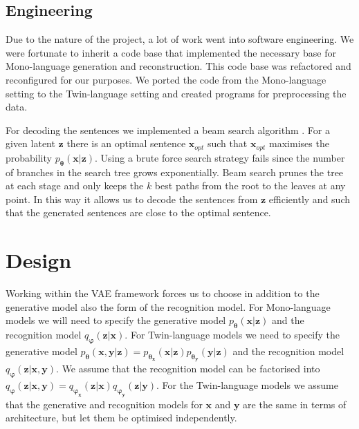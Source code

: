 \subsection{Engineering}
Due to the nature of the project, a lot of work went into software engineering.
We were fortunate to inherit a code base that implemented the necessary base for
Mono-language generation and reconstruction. This code base was refactored and
reconfigured for our purposes. We ported the code from the Mono-language setting
to the Twin-language setting and created programs for preprocessing the data.

For decoding the sentences we implemented a beam search algorithm \cite[p.~249]{Jurafsky:2000:SLP:555733}. For a given
latent $\bm{z}$ there is an optimal sentence $\bm{x}_{opt}$ such that
$\bm{x}_{opt}$ maximises the probability $p_{\bm{\theta}}(\bm{x} | \bm{z})$.
Using a brute force search strategy fails since the number of branches in the
search tree grows exponentially. Beam search prunes the tree at each stage and
only keeps the $k$ best paths from the root to the leaves at any point. In this
way it allows us to decode the sentences from $\bm{z}$ efficiently and such that
the generated sentences are close to the optimal sentence.

\section{Design}
Working within the VAE framework forces us to choose in addition to the generative
model also the form of the recognition model. For Mono-language models we will need to specify the generative model
$p_{\bm{\theta}}(\bm{x} | \bm{z})$ and the recognition model $q_{\bm{\varphi}}(\bm{z} |
\bm{x})$. For Twin-language models we need
to specify the generative model $p_{\bm{\theta}}(\bm{x}, \bm{y} | \bm{z}) = p_{\bm{\theta}_{\bm{x}}}(\bm{x}| \bm{z})p_{\bm{\theta}_{\bm{y}}}(\bm{y}| \bm{z})$ and the
recognition model $q_{\bm{\varphi}}(\bm{z} | \bm{x}, \bm{y})$. We assume that the
recognition model can be factorised into $q_{\bm{\varphi}}(\bm{z} | \bm{x},
\bm{y}) = q_{\bm{\varphi}_{\bm{x}}}(\bm{z} |
\bm{x})q_{\bm{\varphi}_{\bm{y}}}(\bm{z} | \bm{y})$. For the Twin-language models
we assume that the generative and recognition models for $\bm{x}$ and $\bm{y}$
are the same in terms of architecture, but let them be optimised independently.

